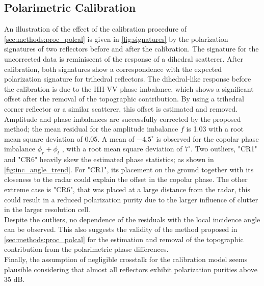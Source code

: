 \subsection{Polarimetric Calibration}
An illustration of the effect of the calibration procedure of \autoref{sec:methods:proc_polcal} is given in  \autoref{fig:signatures} by the polarization signatures of two reflectors before and after the calibration.
The signature for the uncorrected data is reminiscent of the response of a dihedral scatterer. After calibration, both signatures show a correspondence with the expected polarization signature for trihedral reflectors. The dihedral-like response before the calibration is due to the HH-VV phase imbalance, which shows a significant offset after the removal of the topographic contribution. By using a trihedral corner reflector or a similar scatterer, this offset is estimated and removed.\\
Amplitude and  phase imbalances are successfully corrected by the proposed method; the mean residual for the amplitude imbalance $f$ is 1.03 with a root mean square deviation of 0.05. A mean of $-4.5^\circ$ is observed for the copolar phase imbalance $\phi_r + \phi_t$ , with a root mean square deviation of $7^\circ$. Two outliers, "CR1" and "CR6" heavily skew the estimated phase statistics; as shown in \autoref{fig:inc_angle_trend}. For "CR1", its placement on the ground together with its closeness to the radar could explain the offset in the copolar phase. The other extreme case is "CR6", that was placed at a large distance from the radar, this could result in a reduced polarization purity due to the larger influence of clutter in the larger resolution cell.\\ 
Despite the outliers, no dependence of the residuals with the local incidence angle can be observed.
This also suggests the validity of the method proposed in \autoref{sec:methods:proc_polcal} for the estimation and removal of the topographic contribution from the polarimetric phase differences.\\Finally, the assumption of negligible crosstalk for the calibration model seems plausible considering that almost all reflectors exhibit polarization purities above 35 dB.
